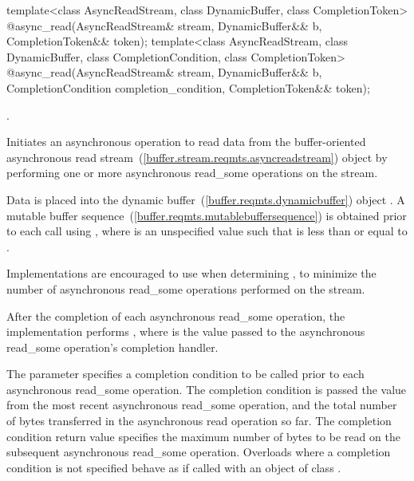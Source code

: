 %
\begin{itemdecl}
template<class AsyncReadStream, class DynamicBuffer, class CompletionToken>
    @\DEDUCED@ async_read(AsyncReadStream& stream,
                       DynamicBuffer&& b, CompletionToken&& token);
template<class AsyncReadStream, class DynamicBuffer, class CompletionCondition,
         class CompletionToken>
    @\DEDUCED@ async_read(AsyncReadStream& stream,
                       DynamicBuffer&& b,
                       CompletionCondition completion_condition,
                       CompletionToken&& token);
\end{itemdecl}

\begin{itemdescr}
\pnum
\completionsig {}.

\pnum
\effects Initiates an asynchronous operation to read data from the buffer-oriented asynchronous read stream~(\ref{buffer.stream.reqmts.asyncreadstream}) object  by performing one or more asynchronous read_some operations on the stream.

\pnum
Data is placed into the dynamic buffer~(\ref{buffer.reqmts.dynamicbuffer}) object . A mutable buffer sequence~(\ref{buffer.reqmts.mutablebuffersequence}) is obtained prior to each  call using , where  is an unspecified value such that  is less than or equal to . \begin{note} Implementations are encouraged to use  when determining , to minimize the number of asynchronous read_some operations performed on the stream. \end{note} After the completion of each asynchronous read_some operation, the implementation performs , where  is the value passed to the asynchronous read_some operation's completion handler.

\pnum
The  parameter specifies a completion condition to be called prior to each asynchronous read_some operation. The completion condition is passed the  value from the most recent asynchronous read_some operation, and the total number of bytes transferred in the asynchronous read operation so far. The completion condition return value specifies the maximum number of bytes to be read on the subsequent asynchronous read_some operation. Overloads where a completion condition is not specified behave as if called with an object of class .


\end{itemdescr}
